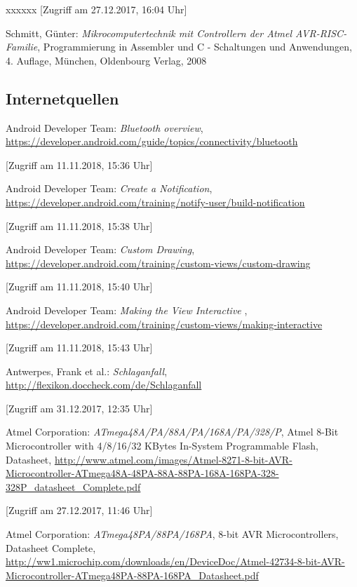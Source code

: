 \begin{thebibliography}{xxxxxx}
[Zugriff am 27.12.2017, 16:04 Uhr]

 Schmitt, Günter: \textit{Mikrocomputertechnik mit Controllern der Atmel AVR-RISC-Familie}, Programmierung in Assembler und C - Schaltungen und Anwendungen, 4. Auflage, München, Oldenbourg Verlag, 2008

\subsection*{Internetquellen}

 Android Developer Team: \textit{Bluetooth overview}, \url{https://developer.android.com/guide/topics/connectivity/bluetooth}

[Zugriff am 11.11.2018, 15:36 Uhr]

 Android Developer Team: \textit{Create a Notification}, \url{https://developer.android.com/training/notify-user/build-notification}

[Zugriff am 11.11.2018, 15:38 Uhr]

 Android Developer Team: \textit{Custom Drawing}, \url{https://developer.android.com/training/custom-views/custom-drawing}

[Zugriff am 11.11.2018, 15:40 Uhr]

 Android Developer Team: \textit{Making the View Interactive
}, \url{https://developer.android.com/training/custom-views/making-interactive}

[Zugriff am 11.11.2018, 15:43 Uhr]

 Antwerpes, Frank et al.: \textit{Schlaganfall}, \url{http://flexikon.doccheck.com/de/Schlaganfall}

[Zugriff am 31.12.2017, 12:35 Uhr]

 Atmel Corporation: \textit{ATmega48A/PA/88A/PA/168A/PA/328/P}, Atmel 8-Bit Microcontroller with 4/8/16/32 KBytes In-System Programmable Flash, Datasheet, \url{http://www.atmel.com/images/Atmel-8271-8-bit-AVR-Microcontroller-ATmega48A-48PA-88A-88PA-168A-168PA-328-328P_datasheet_Complete.pdf} 

[Zugriff am 27.12.2017, 11:46 Uhr]

 Atmel Corporation: \textit{ATmega48PA/88PA/168PA}, 8-bit AVR Microcontrollers, Datasheet Complete, \url{http://ww1.microchip.com/downloads/en/DeviceDoc/Atmel-42734-8-bit-AVR-Microcontroller-ATmega48PA-88PA-168PA_Datasheet.pdf} 


\end{thebibliography}
